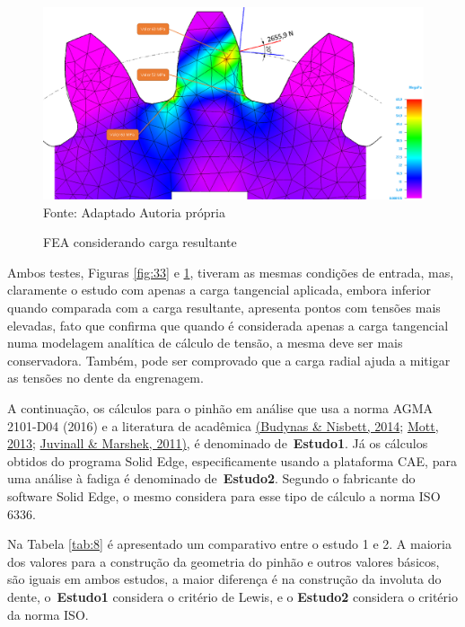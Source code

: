 \documentclass[12pt,a4paper]{article}
\begin{document}
\begin{figure}[!htb]
    \centering
    \caption{FEA considerando carga resultante}
    \includegraphics[scale=0.46]{Imagens/Img34.png}\\
    {\footnotesize Fonte: Adaptado  Autoria própria}
    \label{fig:34}
\end{figure}

Ambos testes, Figuras {\ref{fig:33}} e
{\ref{fig:34}}, tiveram as mesmas condições de entrada,
mas, claramente o estudo com apenas a carga tangencial aplicada, embora
inferior quando comparada com a carga resultante, apresenta pontos com
tensões mais elevadas, fato que confirma que quando é considerada apenas
a carga tangencial numa modelagem analítica de cálculo de tensão, a
mesma deve ser mais conservadora. Também, pode ser comprovado que a
carga radial ajuda a mitigar as tensões no dente da engrenagem.

A continuação, os cálculos para o pinhão em análise que usa a norma AGMA
2101-D04 (2016) e a literatura de acadêmica \hyperref[csl:20]{(Budynas \& Nisbett, 2014}; \hyperref[csl:21]{Mott, 2013}; \hyperref[csl:27]{Juvinall \& Marshek, 2011)}, é
denominado de~\textbf{Estudo1}. Já os cálculos obtidos do programa Solid
Edge, especificamente usando a plataforma CAE, para uma análise à fadiga
é denominado de~\textbf{Estudo2}. Segundo o fabricante do software Solid
Edge, o mesmo considera para esse tipo de cálculo a norma ISO 6336.

Na Tabela \ref{tab:8} é apresentado um comparativo entre o estudo 1 e 2. A
maioria dos valores para a construção da geometria do pinhão e outros
valores básicos, são iguais em ambos estudos, a maior diferença é na
construção da involuta do dente, o~\textbf{Estudo1} considera o critério
de Lewis, e o \textbf{Estudo2} considera o critério da norma ISO.
\end{document}
